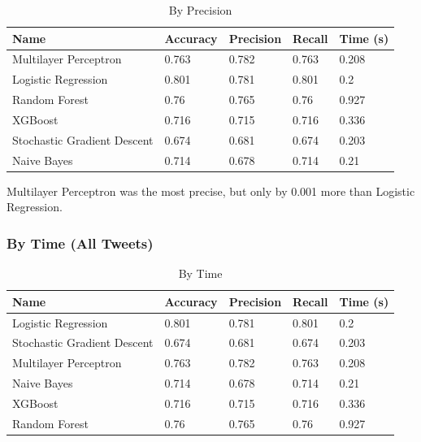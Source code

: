 \documentclass{article}
\begin{document}
\begin{table}[h!]
	\begin{center}
		\caption{By Precision}
		\label{tab:table1}
		\begin{tabular}{l|l|l|l|l}
			\textbf{Name}               & \textbf{Accuracy} & \textbf{Precision} & \textbf{Recall} & \textbf{Time (s)} \\
			\hline
			Multilayer Perceptron       & 0.763             & 0.782              & 0.763           & 0.208             \\
			Logistic Regression         & 0.801             & 0.781              & 0.801           & 0.2               \\
			Random Forest               & 0.76              & 0.765              & 0.76            & 0.927             \\
			XGBoost                     & 0.716             & 0.715              & 0.716           & 0.336             \\
			Stochastic Gradient Descent & 0.674             & 0.681              & 0.674           & 0.203             \\
			Naive Bayes                 & 0.714             & 0.678              & 0.714           & 0.21              \\
		\end{tabular}
	\end{center}
\end{table}

Multilayer Perceptron was the most precise, but only by 0.001 more than Logistic Regression.

\subsubsection{By Time (All Tweets)}

\begin{table}[h!]
	\begin{center}
		\caption{By Time}
		\label{tab:table1}
		\begin{tabular}{l|l|l|l|l}
			\textbf{Name}               & \textbf{Accuracy} & \textbf{Precision} & \textbf{Recall} & \textbf{Time (s)} \\
			\hline
			Logistic Regression         & 0.801             & 0.781              & 0.801           & 0.2               \\
			Stochastic Gradient Descent & 0.674             & 0.681              & 0.674           & 0.203             \\
			Multilayer Perceptron       & 0.763             & 0.782              & 0.763           & 0.208             \\
			Naive Bayes                 & 0.714             & 0.678              & 0.714           & 0.21              \\
			XGBoost                     & 0.716             & 0.715              & 0.716           & 0.336             \\
			Random Forest               & 0.76              & 0.765              & 0.76            & 0.927             \\
		\end{tabular}
	\end{center}
\end{table}
\end{document}
